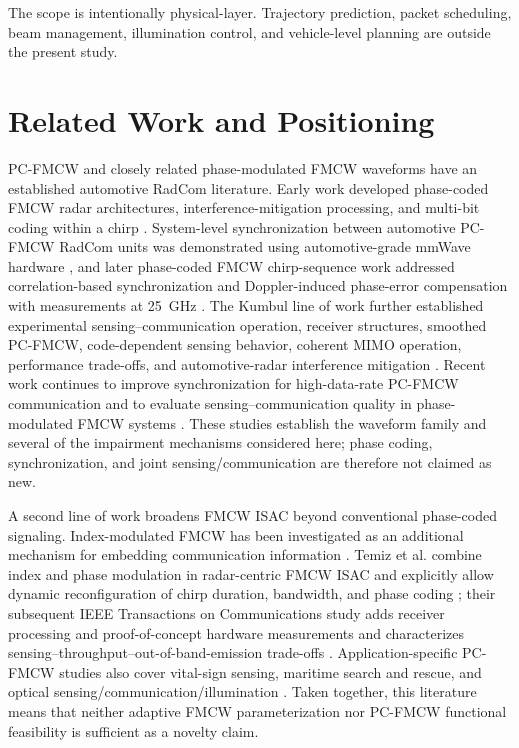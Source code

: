 \documentclass[journal]{IEEEtran}
\begin{document}
The scope is intentionally physical-layer. Trajectory prediction, packet scheduling, beam management, illumination control, and vehicle-level planning are outside the present study.

\section{Related Work and Positioning}
\label{sec:related}

PC-FMCW and closely related phase-modulated FMCW waveforms have an established automotive RadCom literature. Early work developed phase-coded FMCW radar architectures, interference-mitigation processing, and multi-bit coding within a chirp \cite{uysal2020pcfmcw,uysal2020challenges}. System-level synchronization between automotive PC-FMCW RadCom units was demonstrated using automotive-grade mmWave hardware \cite{lampel2020sync}, and later phase-coded FMCW chirp-sequence work addressed correlation-based synchronization and Doppler-induced phase-error compensation with measurements at 25~GHz \cite{alamieldine2024chirpseq}. The Kumbul line of work further established experimental sensing--communication operation, receiver structures, smoothed PC-FMCW, code-dependent sensing behavior, coherent MIMO operation, performance trade-offs, and automotive-radar interference mitigation \cite{kumbul2021experimental,kumbul2022receiver,kumbul2022smoothed,kumbul2022codes,kumbul2023mimo,kumbul2023performance,kumbul2024interference}. Recent work continues to improve synchronization for high-data-rate PC-FMCW communication and to evaluate sensing--communication quality in phase-modulated FMCW systems \cite{alamieldine2026sync,bonsch2025quality}. These studies establish the waveform family and several of the impairment mechanisms considered here; phase coding, synchronization, and joint sensing/communication are therefore not claimed as new.

A second line of work broadens FMCW ISAC beyond conventional phase-coded signaling. Index-modulated FMCW has been investigated as an additional mechanism for embedding communication information \cite{bonsch2026indexfmcw}. Temiz et al. combine index and phase modulation in radar-centric FMCW ISAC and explicitly allow dynamic reconfiguration of chirp duration, bandwidth, and phase coding \cite{temiz2026impm}; their subsequent IEEE Transactions on Communications study adds receiver processing and proof-of-concept hardware measurements and characterizes sensing--throughput--out-of-band-emission trade-offs \cite{temiz2026tcomm}. Application-specific PC-FMCW studies also cover vital-sign sensing, maritime search and rescue, and optical sensing/communication/illumination \cite{zhang2025vitalsigns,xing2025maritime,liu2026laserheadlamp}. Taken together, this literature means that neither adaptive FMCW parameterization nor PC-FMCW functional feasibility is sufficient as a novelty claim.
\end{document}
